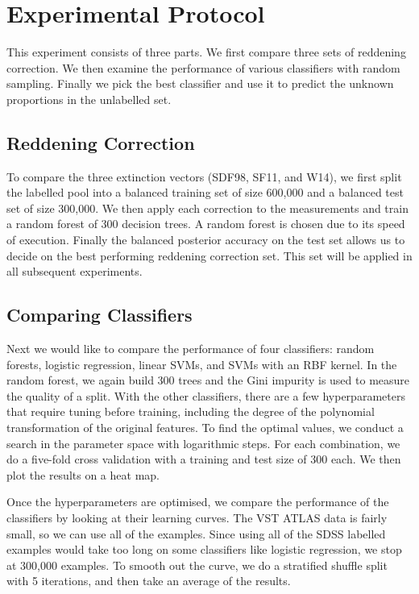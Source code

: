 \section{Experimental Protocol}
\label{sec:protocol1}

This experiment consists of three parts. We first compare three sets of reddening correction.
We then examine the performance of various classifiers with random sampling. Finally
we pick the best classifier and use it to predict the unknown proportions in the unlabelled
set.

\subsection{Reddening Correction}
\label{sub:red}

To compare the three extinction vectors (SDF98, SF11, and W14), we first split the labelled pool
into a balanced training set of size 600,000 and a balanced test set of size 300,000. We then apply
each correction to the measurements and train a random forest of 300 decision trees. A random
forest is chosen due to its speed of execution. Finally the balanced posterior accuracy on the test
set allows us to decide on the best performing reddening correction set. This set will be applied
in all subsequent experiments.

\subsection{Comparing Classifiers}
\label{sub:compare}

Next we would like to compare the performance of four classifiers: random forests, logistic
regression, linear SVMs, and SVMs with an RBF kernel. In the random forest,
we again build 300 trees and the
Gini impurity is used to measure the quality of a split. With the other classifiers,
there
are a few hyperparameters that require tuning before training, including the degree of the polynomial
transformation of the original features. To find the optimal values,
we conduct a search in the parameter space with logarithmic steps. For each combination,
we do a five-fold cross validation with a training and test size of 300 each. We then plot
the results on a heat map.

Once the hyperparameters are optimised, we compare the performance of the classifiers by looking at
their learning curves. The VST ATLAS data is fairly small, so we can use all of the examples. Since
using all of the SDSS labelled examples would take too long on some classifiers like logistic
regression, we stop at 300,000 examples. To smooth out the curve, we do a stratified shuffle split
with 5 iterations, and then take an average of the results.

